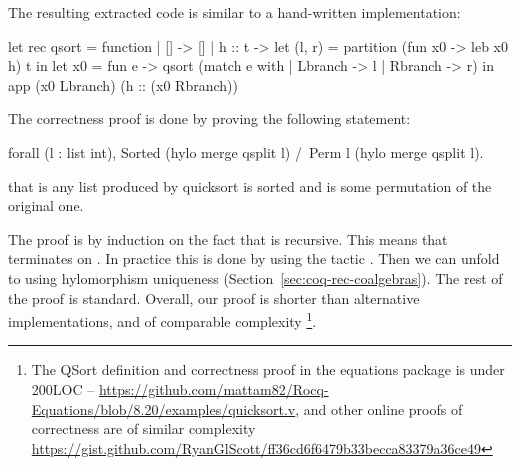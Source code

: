 \documentclass[a4paper,UKenglish,cleveref, autoref, thm-restate]{lipics-v2021}
\begin{document}
The resulting extracted code is similar to a hand-written implementation:
\begin{ocamlcode}
let rec qsort = function
  | [] -> []
  | h :: t -> let (l, r) = partition (fun x0 -> leb x0 h) t in
    let x0 = fun e -> qsort (match e with | Lbranch -> l | Rbranch -> r) in
    app (x0 Lbranch) (h :: (x0 Rbranch))
\end{ocamlcode}
The correctness proof is done by proving the following statement:
\begin{coqcode}
forall (l : list int), Sorted (hylo merge qsplit l) /\ Perm l (hylo merge qsplit l).
\end{coqcode}
that is any list produced by quicksort is sorted and is some permutation of the original one.

The proof is by induction on the fact that  is recursive. This means
that  terminates on .  In practice this is done by using the
tactic . Then we can unfold  to
 using hylomorphism
uniqueness (Section~\ref{sec:coq-rec-coalgebras}). The rest of the proof is standard.
Overall, our proof is shorter than alternative implementations, and of
comparable complexity%
\footnote{The QSort definition and correctness proof in the
equations
package is under 200LOC --
\href{https://github.com/mattam82/Rocq-Equations/blob/8.20/examples/quicksort.v}{https://github.com/mattam82/Rocq-Equations/blob/8.20/examples/quicksort.v},
and other online proofs of correctness are of similar complexity
\href{https://gist.github.com/RyanGlScott/ff36cd6f6479b33becca83379a36ce49}{https://gist.github.com/RyanGlScott/ff36cd6f6479b33becca83379a36ce49}}.


\end{document}
